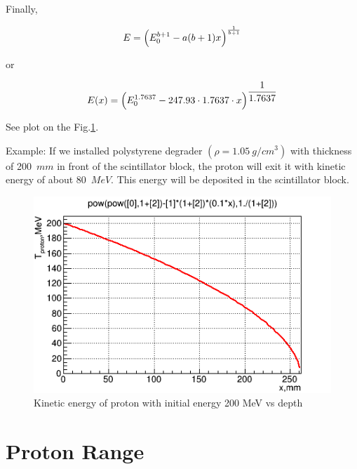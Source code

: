\documentclass[english]{article}
\makeatletter
\def\ScaleIfNeeded{%
\ifdim\Gin@nat@width>\linewidth
\linewidth
\else
\Gin@nat@width
\fi
}
\makeatother
\begin{document}
Finally,

\begin{align}
E = \Bigl( E_0^{b+1} - a(b+1)x \Bigr)^\frac{1}{b+1} \label{eq:E_vs_x}
\end{align}

or

\begin{align*}
E(x) = \Bigl( E_0^{1.7637} - 247.93 \cdot 1.7637 \cdot x \Bigr)^{\dfrac{1}{1.7637}}
\end{align*}

See plot on the Fig.\ref{fig:T_vs_x}.

Example: If we installed polystyrene degrader $(\rho = 1.05~g/cm^3)$ with thickness of 200~$mm$ in front of the scintillator block, the proton will exit it with kinetic energy of about 80~$MeV$. This energy will be deposited in the scintillator block.  

% 
% 

\begin{figure}[h]
\centering
\begin{minipage}[t]{1.0 \linewidth}
\includegraphics[width=\ScaleIfNeeded]{Proton_energy_vs_path_length}
\caption{Kinetic energy of proton with initial energy 200 MeV vs depth}
\label{fig:T_vs_x}
\end{minipage}
\end{figure}

\section{Proton Range}
\end{document}
